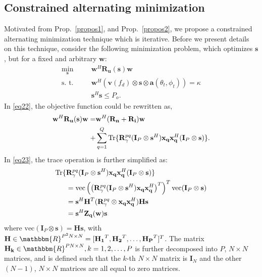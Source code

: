\documentclass[11pt,draftclsnofoot,onecolumn]{IEEEtran}
\theoremstyle{definition}
\theoremstyle{remark}
\begin{document}
\subsection{Constrained alternating minimization}
Motivated from Prop.~\ref{propos1}, and Prop.~\ref{propos2}, we propose a constrained alternating minimization technique which is iterative. Before we present details on this technique, consider the following minimization problem, which optimizes $\mathbf{s}$, but for a fixed and arbitrary $\mathbf{w}$:
\begin{align}
\min\limits_{\mathbf{s}} \;\;\;\;\; &\mathbf{w}^H\mathbf{R_u}(\mathbf{s})\mathbf{w} \nonumber \\
\mbox{s. t. }\;\;\;\;\; & \mathbf{w}^H(\mathbf{v}(f_d)\otimes\mathbf{s}\otimes\mathbf{a}(\theta_t,\phi_t))=\kappa  \label{eq22} \\ 
\;\;\;\;\;\; & \mathbf{s}^H \mathbf{s}\leq P_o. \nonumber \nonumber
\end{align}
In \eqref{eq22}, the objective function could be rewritten as, 
\begin{align} \label{eq23}
\mathbf{w}^H\mathbf{R_u}(\mathbf{s})\mathbf{w}=&\mathbf{w}^H(\mathbf{R_n}+\mathbf{R_i})\mathbf{w} \\
+&\sum\limits_{q=1}^Q \mbox{Tr}\{ \mathbf{R}_{\gamma}^{pq} (\mathbf{I}_P\otimes\mathbf{s}^H)\mathbf{x_q}\mathbf{x}_{\bf q}^H (\mathbf{I}_P\otimes\mathbf{s})\} \nonumber.
\end{align}
In \eqref{eq23}, the trace operation  is further simplified as:
\begin{align} \label{eq24}
\mbox{Tr}\{ &\mathbf{R}_{\gamma}^{pq} (\mathbf{I}_P\otimes\mathbf{s}^H)\mathbf{x_q}\mathbf{x}_{\bf q}^H (\mathbf{I}_P\otimes\mathbf{s})\} \nonumber \\
&=\mbox{vec}\left( \left(\mathbf{R}_{\gamma}^{pq} (\mathbf{I}_P\otimes\mathbf{s}^H)\mathbf{x_q}\mathbf{x}_{\bf q}^H \right)^T \right)^T \mbox{vec}( \mathbf{I}_P\otimes\mathbf{s}) \nonumber 
\\
&=\mathbf{s}^H\mathbf{H}^T ( \mathbf{R}_{\gamma}^{pq}\otimes \mathbf{x_q}\mathbf{x}_{\bf q}^H)\mathbf{H}\mathbf{s}  \nonumber\\
&=\mathbf{s}^H\mathbf{Z_q}(\mathbf{w})\mathbf{s}
\end{align}
where $\mbox{vec}(\mathbf{I}_P\otimes\mathbf{s})=\mathbf{H}\mathbf{s}$, with $\mathbf{H}\in \mathbbm{R}^{P^2N \times N}=[\mathbf{H_1}^T,\mathbf{H_2}^T,\ldots,\mathbf{H_P}^T]^T$. The matrix $\mathbf{H_k}\in\mathbbm{R}^{PN \times N}, k=1,2,\ldots,P$ is further decomposed into $P$, $N\times N$ matrices, and is defined such that the $k$-th $N \times N$ matrix is $\mathbf{I}_N$ and the other $(N-1)$, $N\times N$ matrices are all equal to zero matrices. 
\end{document}
